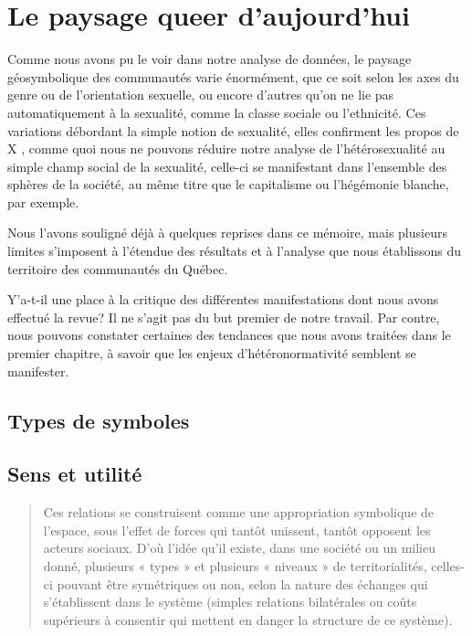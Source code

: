 
\chapter{Le paysage queer d'aujourd'hui}
\label{cha:le_paysage_queer_d_aujourd_hui}
Comme nous avons pu le voir dans notre analyse de données, le paysage géosymbolique des communautés \lgbt{} varie énormément, que ce soit selon les axes du genre ou de l'orientation sexuelle, ou encore d'autres qu'on ne lie pas automatiquement à la sexualité, comme la classe sociale ou l'ethnicité.
Ces variations débordant la simple notion de sexualité, elles confirment les propos de X , comme quoi nous ne pouvons réduire notre analyse de l'hétérosexualité au simple champ social de la sexualité, celle-ci se manifestant dans l'ensemble des sphères de la société, au même titre que le capitalisme ou l'hégémonie blanche, par exemple.


Nous l'avons souligné déjà à quelques reprises dans ce mémoire, mais plusieurs limites s'imposent à l'étendue des résultats et à l'analyse que nous établissons du territoire des communautés \lgbt{} du Québec.

Y'a-t-il une place à la critique des différentes manifestations dont nous avons effectué la revue?
Il ne s'agit pas du but premier de notre travail.
Par contre, nous pouvons constater certaines des tendances que nous avons traitées dans le premier chapitre, à savoir que les enjeux d'hétéronormativité semblent se manifester.

\section{Types de symboles}
\label{sec:types_de_symboles}


\section{Sens et utilité}
\label{sec:sens_et_utilit_}
\begin{quotation}
Ces relations se construisent comme une appropriation symbolique de l'espace, sous l'effet de forces qui tantôt unissent, tantôt opposent les acteurs sociaux.
D'où l'idée qu'il existe, dans une société ou un milieu donné, plusieurs « types » et plusieurs « niveaux » de territorialités, celles-ci pouvant être symétriques ou non, selon la nature des échanges qui s'établissent dans le système (simples relations bilatérales ou coûts supérieurs à consentir qui mettent en danger la structure de ce système).\citep[41]{Courville1991}
\end{quotation}

